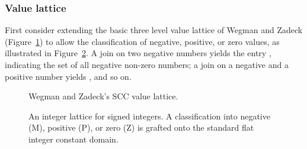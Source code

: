 \documentclass{acmconf}
\newcommand{\figscale}{1.0}
\begin{document}
\subsubsection{Value lattice}
First consider extending the basic three level value lattice of Wegman and
Zadeck (Figure~\ref{fig:wzlat}) to allow the classification of
negative, positive, or zero
values, as illustrated in Figure~\ref{fig:scclat6}.
A join on two negative numbers yields the entry ,
indicating the set of all negative non-zero numbers; a
join on a negative and a positive number yields , and so on.
\begin{figure}
\centering\renewcommand{\figscale}{0.6}
\caption{Wegman and Zadeck's SCC value lattice.}
\label{fig:wzlat}
\end{figure}
\begin{figure}
\centering\renewcommand{\figscale}{0.6}
\caption[An integer lattice for signed integers.]
{An integer lattice for signed integers. A classification into
negative (M), positive (P), or zero (Z) is grafted onto the standard
flat integer constant domain.}
\label{fig:scclat6}
\end{figure}
\end{document}
